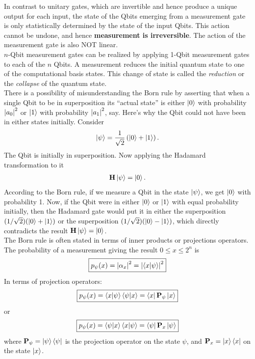 \documentclass{book}
\theoremstyle{definition}
\newcommand{\f}[2]{\frac{#1}{#2}}
\newcommand{\lp}{\left(}
\newcommand{\rp}{\right)}
\newcommand{\had}{\mathbf{H}}
\begin{document}
In contrast to unitary gates, which are invertible and hence produce a unique output for each input, the state of the Qbits emerging from a measurement gate is only statistically determined by the state of the input Qbits. This action cannot be undone, and hence \textbf{measurement is irreversible}. The action of the measurement gate is also NOT linear. \\

$n$-Qbit measurement gates can be realized by applying 1-Qbit measurement gates to each of the $n$ Qbits. A measurement reduces the initial quantum state to one of the computational basis states. This change of state is called the \textit{reduction} or the \textit{collapse} of the quantum state. \\

There is a possibility of misunderstanding the Born rule by asserting that when a single Qbit to be in superposition its ``actual state'' is either $\ket{0}$ with probability $\abs{a_0}^2$ or $\ket{1}$ with probability $\abs{a_1}^2$, say. Here's why the Qbit could not have been in either states initially. Consider 
\begin{align}
\ket{\psi} = \f{1}{\sqrt{2}}\lp \ket{0} + \ket{1} \rp.
\end{align} 
The Qbit is initially in superposition. Now applying the Hadamard transformation to it 
\begin{align}
\had \ket{\psi} = \ket{0}.
\end{align}
According to the Born rule, if we measure a Qbit in the state $\ket{\psi}$, we get $\ket{0}$ with probability 1. Now, if the Qbit were in either $\ket{0}$ or $\ket{1}$ with equal probability initially, then the Hadamard gate would put it in either the superposition $(1/\sqrt{2})(\ket{0}+\ket{1})$ or the superposition $(1/\sqrt{2})(\ket{0}-\ket{1})$, which directly contradicts the result $\had \ket{\psi} = \ket{0}$. \\

The Born rule is often stated in terms of inner products or projections operators. The probability of a measurement giving the result $0 \leq x \leq 2^n$ is 
\begin{align}
\boxed{p_{\psi}(x) = \abs{\alpha_x}^2 = \abs{\braket{x}{\psi}}^2}
\end{align}
In terms of projection operators:
\begin{align}
\boxed{p_\psi(x) = \braket{x}{\psi}\braket{\psi}{x} = \bra{x}\mathbf{P}_\psi\ket{x}}
\end{align}
or 
\begin{align}
\boxed{p_\psi(x) = \braket{\psi}{x}\braket{x}{\psi} = \bra{\psi}\mathbf{P}_x\ket{\psi}}
\end{align}
where $\mathbf{P}_\psi = \ket{\psi}\bra{\psi}$ is the projection operator on the state $\psi$, and $\mathbf{P}_x = \ket{x}\bra{x}$ on the state $\ket{x}$. 
\end{document}
